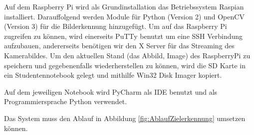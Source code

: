 \documentclass[a4paper]{report}
\begin{document}
Auf dem Raspberry Pi wird als Grundinstallation das Betriebssystem Raspian installiert. Darauffolgend werden Module für Python (Version 2) und OpenCV (Version 3) für die Bilderkennung hinzugefügt.
Um auf das Raspberry Pi zugreifen zu können, wird einerseits PuTTy benutzt um eine SSH Verbindung aufzubauen, andererseits benötigen wir den X Server für das Streaming des Kamerabildes.
Um den aktuellen Stand (das Abbild, Image) des RaspberryPi zu speichern und gegebenenfalls wiederherstellen zu können, wird die SD Karte in ein Studentennotebook gelegt und mithilfe Win32 Disk Imager kopiert.

Auf dem jeweiligen Notebook wird PyCharm als IDE benutzt und als Programmiersprache Python verwendet.

Das System muss den Ablauf in Abbildung \ref{fig:AblaufZielerkennung} umsetzen können.
\end{document}
